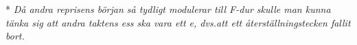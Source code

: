 \vspace{5mm}
* \textit{
Då andra reprisens början så tydligt modulerar till F-dur skulle man kunna tänka sig att
andra taktens ess ska vara ett e, dvs.\@ att ett återställningstecken fallit bort.
}